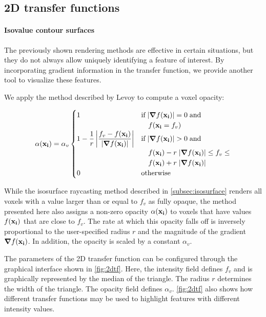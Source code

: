 \documentclass[a4paper]{article}
\begin{document}
\subsection{2D transfer functions}

\paragraph{Isovalue contour surfaces}

The previously shown rendering methods are effective in certain situations, but they do not always allow uniquely identifying a feature of interest. By incorporating gradient information in the transfer function, we provide another tool to visualize these features.

We apply the method described by Levoy\citep{levoy_1988} to compute a voxel opacity:

\begin{equation*}
\alpha(\vb{x_i}) = \alpha_v
\begin{cases}
  1 &\text{if}\;|\grad f(\vb{x_i})| = 0\;\text{and}\\
  &\quad f(\vb{x_i} = f_v)\\
  1 - \dfrac{1}{r} \left| \dfrac{f_v - f(\vb{x_i})}{|\grad f(\vb{x_i})|}\right| &\text{if}\; |\grad f(\vb{x_i})| > 0\;\text{and}\;\\
  &\quad f(\vb{x_i}) - r\; |\grad f(\vb{x_i})| \leq f_v \leq\\
  &\quad f(\vb{x_i}) + r\; |\grad f(\vb{x_i})|\\
  0 &\text{otherwise}
\end{cases}
\end{equation*}

While the isosurface raycasting method described in \autoref{subsec:isosurface} renders all voxels with a value larger than or equal to $f_v$ as fully opaque, the method presented here also assigns a non-zero opacity $\alpha(\vb{x_i})$ to voxels that have values $f(\vb{x_i})$ that are close to $f_v$. The rate at which this opacity falls off is inversely proportional to the user-specified radius $r$ and the magnitude of the gradient $\grad f(\vb{x_i})$. In addition, the opacity is scaled by a constant $\alpha_v$.

The parameters of the 2D transfer function can be configured through the graphical interface shown in \autoref{fig:2dtf}. Here, the intensity field defines $f_v$ and is graphically represented by the median of the triangle. The radius $r$ determines the width of the triangle. The opacity field defines $\alpha_v$. \autoref{fig:2dtf} also shows how different transfer functions may be used to highlight features with different intensity values.
\end{document}
